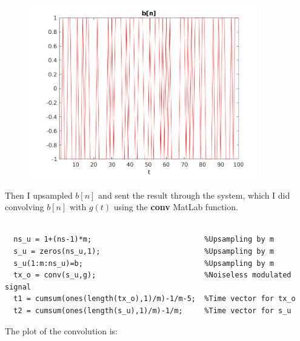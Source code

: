 \documentclass[a4paper,11pt]{article}
\begin{document}
\begin{figure}[!hp]
    \begin{center}
      \includegraphics[width=0.9\textwidth]{images/exercise3.png}
    \end{center}
\end{figure}

\newpage

Then I upsampled $b[n]$ and sent the result through the system, which I did
convolving $b[n]$ with $g(t)$ using the \textbf{conv} MatLab function.

\bigskip

\begin{lstlisting}

  ns_u = 1+(ns-1)*m;                          %Upsampling by m
  s_u = zeros(ns_u,1);                        %Upsampling by m
  s_u(1:m:ns_u)=b;                            %Upsampling by m
  tx_o = conv(s_u,g);                         %Noiseless modulated signal
  t1 = cumsum(ones(length(tx_o),1)/m)-1/m-5;  %Time vector for tx_o
  t2 = cumsum(ones(length(s_u),1)/m)-1/m;     %Time vector for s_u

\end{lstlisting}

\bigskip

The plot of the convolution is:
\end{document}
